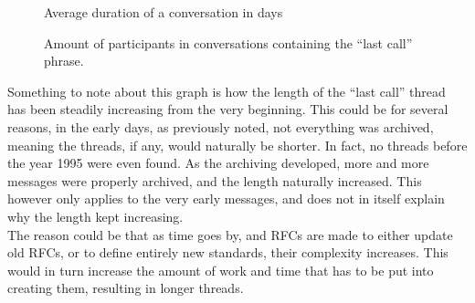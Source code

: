 \documentclass[a4paper,english]{report}
\begin{document}
\begin{figure}[H]
\caption{Average duration of a conversation in days }
\end{figure}


\begin{figure}[H]
\hspace*{-0.5cm}
\caption{Amount of participants in conversations containing the “last call” phrase.}
\end{figure}



Something to note about this graph is how the length of the “last call” thread has been steadily increasing from the very beginning. This could be for several reasons, in the early days, as previously noted, not everything was archived,  meaning the threads, if any, would naturally be shorter. In fact, no threads before the year 1995 were even found.
As the archiving developed, more and more messages were properly archived, and the length naturally increased. This however only applies to the very early messages, and does not in itself explain why the length kept increasing.\\

The reason could be that as time goes by, and RFCs are made to either update old RFCs, or to define entirely new standards, their complexity increases. This would in turn increase the amount of work and time that has to be put into creating them, resulting in longer threads. \\
\end{document}
